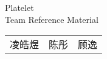 \documentclass[a4page]{book}
\begin{document}
	\begin{titlepage}
		\centering
		\Huge Platelet\\
		\normalsize Team Reference Material\\
		\begin{tabular}{l|l|l}
			凌皓煜 & 陈彤 & 顾逸
		\end{tabular}
	\end{titlepage}
	\tableofcontents
	
	
	
	
	
	
\end{document}
